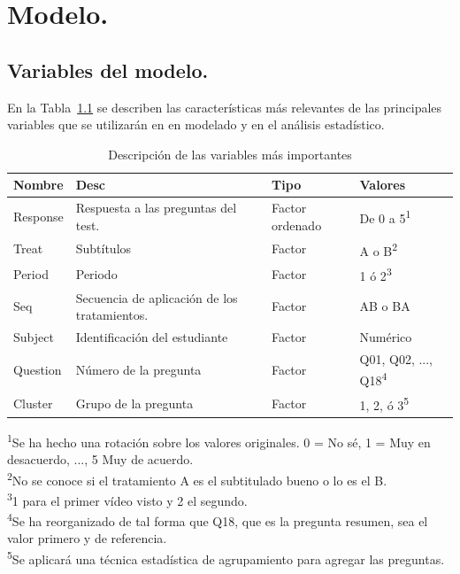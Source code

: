 \documentclass[
  12pt,
  a4paper,
  extrafontsizes,
  onecolumn,
  openright]{memoir}
\begin{document}
\clearpage


\hypertarget{modelo.}{%
\chapter{Modelo.}\label{modelo.}}

\hypertarget{variables}{%
\section{Variables del modelo.}\label{variables}}

En la Tabla~\ref{tbl-variables} se describen las características más
relevantes de las principales variables que se utilizarán en en modelado
y en el análisis estadístico. \footnotesize

\hypertarget{tbl-variables}{}
\setlength{\LTpost}{0mm}
\begin{longtable}{llll}
\caption{\label{tbl-variables}Descripción de las variables más importantes }\tabularnewline

\toprule
Nombre & Desc & Tipo & Valores \\ 
\midrule
Response & Respuesta a las preguntas del test. & Factor ordenado & De 0 a 5\textsuperscript{1} \\ 
Treat & Subtítulos & Factor & A o B\textsuperscript{2} \\ 
Period & Periodo & Factor & 1 ó 2\textsuperscript{3} \\ 
Seq & Secuencia de aplicación de los tratamientos. & Factor & AB o BA \\ 
Subject & Identificación del estudiante & Factor & Numérico \\ 
Question & Número de la pregunta & Factor & Q01, Q02, ..., Q18\textsuperscript{4} \\ 
Cluster & Grupo de la pregunta & Factor & 1, 2, ó 3\textsuperscript{5} \\ 
\bottomrule
\end{longtable}
\begin{minipage}{\linewidth}
\textsuperscript{1}Se ha hecho una rotación sobre los valores originales. 0 = No sé, 1 = Muy en desacuerdo, ..., 5 Muy de acuerdo.\\
\textsuperscript{2}No se conoce si el tratamiento A es el subtitulado bueno o lo es el B.\\
\textsuperscript{3}1 para el primer vídeo visto y 2 el segundo.\\
\textsuperscript{4}Se ha reorganizado de tal forma que Q18, que es la pregunta resumen, sea el valor primero y de referencia.\\
\textsuperscript{5}Se aplicará una técnica estadística de agrupamiento para agregar las preguntas.\\
\end{minipage}
\end{document}
